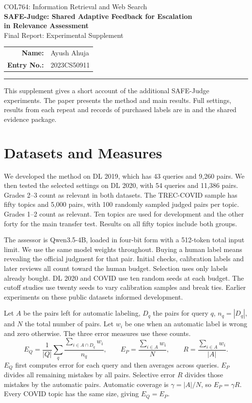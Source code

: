 \documentclass[11pt,a4paper]{article}
\begin{document}
\begin{center}
{\small COL764: Information Retrieval and Web Search}\\[4pt]
{\Large\bfseries SAFE-Judge: Shared Adaptive Feedback for Escalation\\[2pt]
in Relevance Assessment}\\[6pt]
{\large Final Report: Experimental Supplement}\\[8pt]
\begin{tabular}{rl}
\textbf{Name:} & Ayush Ahuja \\
\textbf{Entry No.:} & 2023CS50911 \\
\end{tabular}
\end{center}
\vspace{-2pt}\hrule\vspace{6pt}
This supplement gives a short account of the additional SAFE-Judge experiments.
The paper presents the method and main results. Full settings, results from each
repeat and records of purchased labels are in  and the
shared evidence package.

\section{Datasets and Measures}
We developed the method on DL 2019, which has 43 queries and 9,260 pairs.
We then tested the selected settings on DL 2020, with 54 queries and 11,386 pairs.
Grades 2--3 count as relevant in both datasets. The TREC-COVID sample has fifty
topics and 5,000 pairs, with 100 randomly sampled judged pairs per topic.
Grades 1--2 count as relevant. Ten topics are used for development and the other
forty for the main transfer test. Results on all fifty topics include both groups.

The assessor is Qwen3.5-4B, loaded in four-bit form with a 512-token total input
limit. We use the same model weights throughout. Buying a human label means
revealing the official judgment for that pair. Initial checks, calibration
labels and later reviews all count toward the human budget. Selection uses
only labels already bought. DL 2020 and COVID use ten random seeds at each
budget. The cutoff studies use twenty seeds to vary calibration samples and
break ties. Earlier experiments on these public datasets informed development.

Let $A$ be the pairs left for automatic labeling, $D_q$ the pairs for query $q$,
$n_q=|D_q|$, and $N$ the total number of pairs. Let $w_i$ be one when an automatic
label is wrong and zero otherwise. The three error measures use these counts.
\[
 E_Q=\frac1{|Q|}\sum_q\frac{\sum_{i\in A\cap D_q}w_i}{n_q},\qquad
 E_P=\frac{\sum_{i\in A}w_i}{N},\qquad
 R=\frac{\sum_{i\in A}w_i}{|A|}.
\]
$E_Q$ first computes error for each query and then averages across queries.
$E_P$ divides all remaining mistakes by all pairs. Selective error $R$ divides
those mistakes by the automatic pairs. Automatic coverage is $\gamma=|A|/N$,
so $E_P=\gamma R$. Every COVID topic has the same size, giving $E_Q=E_P$.
\end{document}
